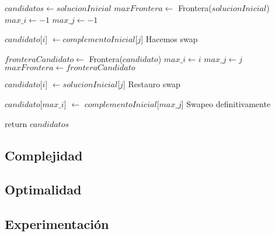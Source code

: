 \begin{algorithm}[H]
\begin{algorithmic}

    \State $candidatos \gets solucionInicial$
    \State $maxFrontera \gets$ Frontera($solucionInicial$)
    \State $max\_i \gets -1$
    \State $max\_j \gets -1$

    \For{$i \in [0..|solucionInicial|)$}
        \For{$j \in [0..|complementoInicial|)$}

            \State $candidato$[$i$] $\gets complementoInicial$[$j$] \Comment Hacemos swap

                \State $fronteraCandidato \gets$ Frontera($candidato$)
                    \State $max\_i \gets i$
                    \State $max\_j \gets j$
                    \State $maxFrontera \gets fronteraCandidato$
                \EndIf
            \EndIf

            \State $candidato$[$i$] $\gets solucionInicial$[$j$] \Comment Restauro swap
        \EndFor
    \EndFor

        \State $candidato$[$max\_i$] $\gets$ $complementoInicial$[$max\_j$] \Comment Swapeo definitivamente
    \EndIf

    \State return $candidatos$

\EndFunction
\end{algorithmic}
\end{algorithm}




\begin{algorithm}[H]
\begin{algorithmic}
\EndFunction
\end{algorithmic}
\end{algorithm}


\begin{algorithm}[H]
\begin{algorithmic}
\EndFunction
\end{algorithmic}
\end{algorithm}


\begin{algorithm}[H]
\begin{algorithmic}
\EndFunction
\end{algorithmic}
\end{algorithm}


\subsection{Complejidad}

\subsection{Optimalidad}

\subsection{Experimentación}